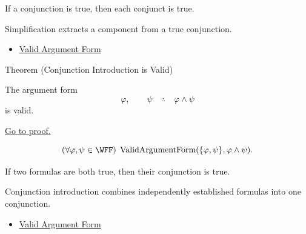 \begin{remark*}
If a conjunction is true, then each conjunct is true.
\end{remark*}

\begin{remark*}[Interpretation]
Simplification extracts a component from a true conjunction.
\end{remark*}

\begin{dependencies}
\begin{itemize}
  \item \hyperref[def:valid-argument-form-propositional-logic]{Valid Argument Form}
\end{itemize}
\end{dependencies}

\begin{theorembox}{Theorem (Conjunction Introduction is Valid)}
\begin{theorem}
\label{thm:conjunction-introduction-validity-propositional-logic}
The argument form
\[
\varphi,\qquad \psi \quad\therefore\quad \varphi\land\psi
\]
is valid.

\noindent\hyperref[prf:conjunction-introduction-validity-propositional-logic]{Go to proof.}
\end{theorem}
\end{theorembox}

\begin{remark*}
\[
(\forall\varphi,\psi\in\WFF)\;\operatorname{ValidArgumentForm}(\{\varphi,\psi\},\varphi\land\psi).
\]
\end{remark*}

\begin{remark*}
If two formulas are both true, then their conjunction is true.
\end{remark*}

\begin{remark*}[Interpretation]
Conjunction introduction combines independently established formulas into one conjunction.
\end{remark*}

\begin{dependencies}
\begin{itemize}
  \item \hyperref[def:valid-argument-form-propositional-logic]{Valid Argument Form}
\end{itemize}
\end{dependencies}

